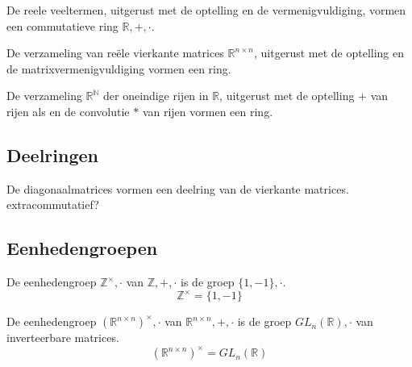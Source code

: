 \documentclass[main.tex]{subfiles}
\begin{document}
\begin{vb}
  De reele veeltermen, uitgerust met de optelling en de vermenigvuldiging, vormen een commutatieve ring $\mathbb{R},+,\cdot$.\\
  \commj
\end{vb}

\begin{vb}
  De verzameling van re\"ele vierkante matrices $\mathbb{R}^{n\times n}$, uitgerust met de optelling en de matrixvermenigvuldiging vormen een ring. 
\end{vb}

\begin{vb}
  De verzameling $\mathbb{R}^{\mathbb{N}}$ der oneindige rijen in $\mathbb{R}$, uitgerust met de optelling $+$ van rijen als en de convolutie $*$ van rijen vormen een ring.\\
  \commj
\end{vb}

\subsection{Deelringen}
\label{sec:deelringen}

\begin{vb}
  De diagonaalmatrices vormen een deelring van de vierkante matrices.
  extra{commutatief?}
\end{vb}



\subsection{Eenhedengroepen}
\label{sec:eenhedengroepen}

\begin{vb}
  De eenhedengroep $\mathbb{Z}^{\times},\cdot$ van $\mathbb{Z},+,\cdot$ is de groep $\{1,-1\},\cdot$.
  \[ \mathbb{Z}^{\times} = \{1,-1\}\]
\end{vb}

\begin{vb}
  De eenhedengroep $(\mathbb{R}^{n\times n})^{\times},\cdot$ van $\mathbb{R}^{n\times n},+,\cdot$ is de groep $GL_{n}(\mathbb{R}),\cdot$ van inverteerbare matrices.
  \[ (\mathbb{R}^{n\times n})^{\times} = GL_{n}(\mathbb{R}) \]
\end{vb}
\end{document}
